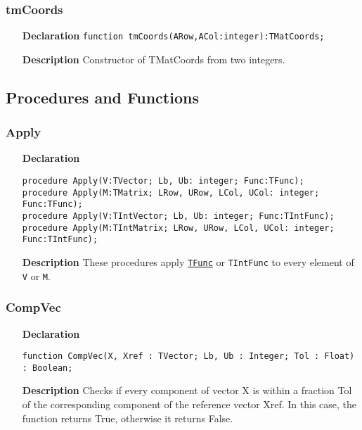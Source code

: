 \documentclass[12pt,a4paper,oneside]{report}
\newcommand{\declarationitem}[1]{\textbf{#1}}
\newcommand{\descriptiontitle}[1]{\textbf{#1}}
\newcommand{\code}[1]{\texttt{#1}}
\begin{document}
\subsubsection{tmCoords}
\begin{itemize}\label{uvecutils:tmcoords}
\item[\declarationitem{Declaration}\hfill]
\code{function tmCoords(ARow,ACol:integer):TMatCoords;}
\item[\descriptiontitle{Description}]
Constructor of TMatCoords from two integers.
\end{itemize}
\subsection{Procedures and Functions}
\subsubsection{Apply}
\label{uvecutils:apply}
\begin{itemize}
	\item[\declarationitem{Declaration}\hfill]
\begin{flushleft}	\code{procedure Apply(V:TVector; Lb, Ub: integer; Func:TFunc);\\ \vspace{4pt}
	procedure Apply(M:TMatrix; LRow, URow, LCol, UCol: integer; Func:TFunc); \\ \vspace{4pt}
	procedure Apply(V:TIntVector; Lb, Ub: integer; Func:TIntFunc);\\ \vspace{4pt}
	procedure Apply(M:TIntMatrix; LRow, URow, LCol, UCol: integer; Func:TIntFunc);}
\end{flushleft}	\item[\descriptiontitle{Description}]
	These procedures apply \hyperref[utypes-TFunc]{\code{TFunc}} or \code{TIntFunc} to every element of \code{V} or \code{M}.
\end{itemize}
\subsubsection{CompVec}
\label{uvectutils:compvec}
\begin{itemize}
	\item[\declarationitem{Declaration}\hfill]
\begin{flushleft}\code{function CompVec(X, Xref : TVector; Lb, Ub  : Integer; Tol : Float) : Boolean;}
\end{flushleft}\item[\descriptiontitle{Description}]
 Checks if every component of vector X is within a fraction Tol of
the corresponding component of the reference vector Xref. In this
case, the function returns True, otherwise it returns False.
\end{itemize}
\end{document}

